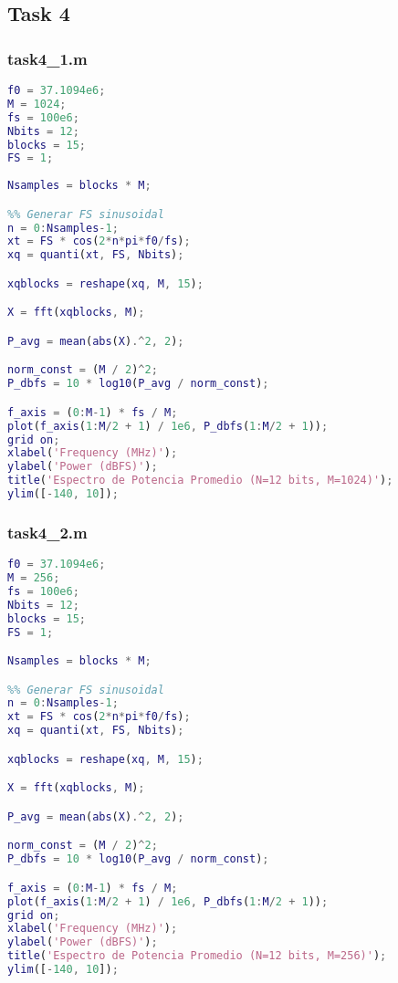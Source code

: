 \subsection{Task 4}
\subsubsection{task4\_1.m}

\begin{lstlisting}[language=Matlab]
f0 = 37.1094e6;
M = 1024;
fs = 100e6;
Nbits = 12;
blocks = 15;
FS = 1;
                                                                                                                                                                                                                                                                                                                                                                                                                                                                                                                                                                                                                                                    
Nsamples = blocks * M;

%% Generar FS sinusoidal
n = 0:Nsamples-1;
xt = FS * cos(2*n*pi*f0/fs);
xq = quanti(xt, FS, Nbits);

xqblocks = reshape(xq, M, 15);

X = fft(xqblocks, M);

P_avg = mean(abs(X).^2, 2);

norm_const = (M / 2)^2;
P_dbfs = 10 * log10(P_avg / norm_const);

f_axis = (0:M-1) * fs / M; 
plot(f_axis(1:M/2 + 1) / 1e6, P_dbfs(1:M/2 + 1));
grid on;
xlabel('Frequency (MHz)');
ylabel('Power (dBFS)');
title('Espectro de Potencia Promedio (N=12 bits, M=1024)');
ylim([-140, 10]);
\end{lstlisting}


\subsubsection{task4\_2.m}
\begin{lstlisting}[language=Matlab]
f0 = 37.1094e6;
M = 256;
fs = 100e6;
Nbits = 12;
blocks = 15;
FS = 1;

Nsamples = blocks * M;

%% Generar FS sinusoidal
n = 0:Nsamples-1;
xt = FS * cos(2*n*pi*f0/fs);
xq = quanti(xt, FS, Nbits);

xqblocks = reshape(xq, M, 15);

X = fft(xqblocks, M);

P_avg = mean(abs(X).^2, 2);

norm_const = (M / 2)^2;
P_dbfs = 10 * log10(P_avg / norm_const);

f_axis = (0:M-1) * fs / M;
plot(f_axis(1:M/2 + 1) / 1e6, P_dbfs(1:M/2 + 1));
grid on;
xlabel('Frequency (MHz)');
ylabel('Power (dBFS)');
title('Espectro de Potencia Promedio (N=12 bits, M=256)');
ylim([-140, 10]);
\end{lstlisting}


